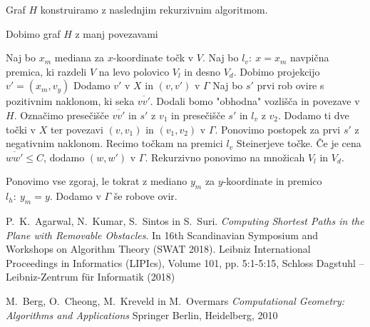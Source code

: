 \documentclass{article}
\begin{document}
Graf $H$ konstruiramo z naslednjim rekurzivnim algoritmom.

\begin{algorithm}
    \caption{Dobimo graf $H$ z manj povezavami}
    \begin{algorithmic}[1]
        \State Naj bo $x_m$ mediana za $x$-koordinate točk v $V$. 
        \State  Naj bo $l_v: \ x = x_m$ navpična premica, ki razdeli $V$ na levo polovico $V_l$ in desno $V_d$.
            \State Dobimo projekcijo $v' = (x_m,v_y)$
                \State Dodamo $v'$ v $X$ in $(v,v')$ v $\Gamma$
            \EndIf
            \State Naj bo $s'$ prvi rob ovire s pozitivnim naklonom, ki seka $\overline{vv'}$. 
                \State Dodali bomo "obhodna" vozlišča in povezave v $H$.
                \State Označimo presečišče $\overline{vv'}$ in $s'$ z $v_1$ in presečišče $s'$ in $l_v$ z $v_2$. 
                \State Dodamo ti dve točki v $X$ ter povezavi $(v,v_1)$ in $(v_1,v_2)$ v $\Gamma$.
            \EndIf
            \State Ponovimo postopek za prvi $s'$ z negativnim naklonom.
            \State Recimo točkam na premici $l_v$ Steinerjeve točke.
                \State Če je cena $\overline{ww'} \leq C$, dodamo $(w,w')$ v $\Gamma$.
            \EndFor
        \EndFor
        \State Rekurzivno ponovimo na množicah $V_l$ in $V_d$.
        
        \State Ponovimo vse zgoraj, le tokrat z mediano $y_m$ za $y$-koordinate  in premico $l_h: \ y_m = y$.
        \State Dodamo v $\Gamma$ še robove ovir.
    \end{algorithmic}
\end{algorithm}


\begin{thebibliography}{99}

     P.~K.~Agarwal, N.~Kumar, S.~Sintos in S.~Suri. \emph{Computing Shortest Paths in the Plane with Removable Obstacles}. In 16th Scandinavian Symposium and Workshops on Algorithm Theory (SWAT 2018). Leibniz International Proceedings in Informatics (LIPIcs), Volume 101, pp. 5:1-5:15, Schloss Dagstuhl – Leibniz-Zentrum für Informatik (2018)

     M.~Berg, O.~Cheong, M.~Kreveld in  M.~Overmars \emph{Computational Geometry: Algorithms and Applications} Springer Berlin, Heidelberg, 2010

\end{thebibliography}
\end{document}
